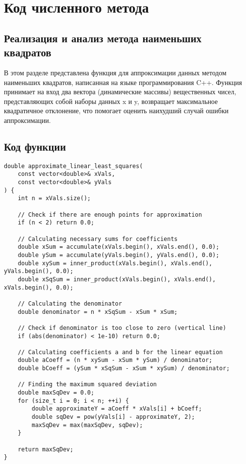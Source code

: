 \section{Код численного метода}

\subsection{Реализация и анализ метода наименьших квадратов}
В этом разделе представлена функция для аппроксимации данных методом наименьших квадратов, написанная на языке программирования C++. Функция принимает на вход два вектора (динамические массивы) вещественных чисел, представляющих собой наборы данных x и y, возвращает максимальное квадратичное отклонение, что помогает оценить наихудший случай ошибки аппроксимации.

\subsection{Код функции}
\begin{lstlisting}
double approximate_linear_least_squares(
    const vector<double>& xVals, 
    const vector<double>& yVals
) {
    int n = xVals.size();    

    // Check if there are enough points for approximation
    if (n < 2) return 0.0;
    
    // Calculating necessary sums for coefficients
    double xSum = accumulate(xVals.begin(), xVals.end(), 0.0);
    double ySum = accumulate(yVals.begin(), yVals.end(), 0.0);
    double xySum = inner_product(xVals.begin(), xVals.end(), yVals.begin(), 0.0);
    double xSqSum = inner_product(xVals.begin(), xVals.end(), xVals.begin(), 0.0);
    
    // Calculating the denominator
    double denominator = n * xSqSum - xSum * xSum;
    
    // Check if denominator is too close to zero (vertical line)
    if (abs(denominator) < 1e-10) return 0.0;
    
    // Calculating coefficients a and b for the linear equation
    double aCoeff = (n * xySum - xSum * ySum) / denominator;
    double bCoeff = (ySum * xSqSum - xSum * xySum) / denominator;
    
    // Finding the maximum squared deviation
    double maxSqDev = 0.0;
    for (size_t i = 0; i < n; ++i) {
        double approximateY = aCoeff * xVals[i] + bCoeff;
        double sqDev = pow(yVals[i] - approximateY, 2);
        maxSqDev = max(maxSqDev, sqDev);
    }
    
    return maxSqDev;
}
\end{lstlisting}
